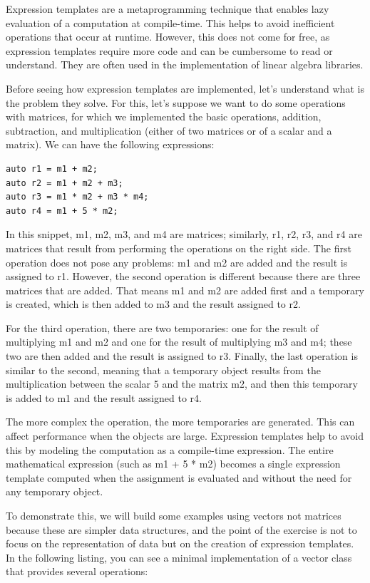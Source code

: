 
Expression templates are a metaprogramming technique that enables lazy evaluation of a computation at compile-time. This helps to avoid inefficient operations that occur at runtime. However, this does not come for free, as expression templates require more code and can be cumbersome to read or understand. They are often used in the implementation of linear algebra libraries.

Before seeing how expression templates are implemented, let’s understand what is the problem they solve. For this, let’s suppose we want to do some operations with matrices, for which we implemented the basic operations, addition, subtraction, and multiplication (either of two matrices or of a scalar and a matrix). We can have the following expressions:

\begin{lstlisting}[style=styleCXX]
auto r1 = m1 + m2;
auto r2 = m1 + m2 + m3;
auto r3 = m1 * m2 + m3 * m4;
auto r4 = m1 + 5 * m2;
\end{lstlisting}

In this snippet, m1, m2, m3, and m4 are matrices; similarly, r1, r2, r3, and r4 are matrices that result from performing the operations on the right side. The first operation does not pose any problems: m1 and m2 are added and the result is assigned to r1. However, the second operation is different because there are three matrices that are added. That means m1 and m2 are added first and a temporary is created, which is then added to m3 and the result assigned to r2.

For the third operation, there are two temporaries: one for the result of multiplying m1 and m2 and one for the result of multiplying m3 and m4; these two are then added and the result is assigned to r3. Finally, the last operation is similar to the second, meaning that a temporary object results from the multiplication between the scalar 5 and the matrix m2, and then this temporary is added to m1 and the result assigned to r4.

The more complex the operation, the more temporaries are generated. This can affect performance when the objects are large. Expression templates help to avoid this by modeling the computation as a compile-time expression. The entire mathematical expression (such as m1 + 5 * m2) becomes a single expression template computed when the assignment is evaluated and without the need for any temporary object.

To demonstrate this, we will build some examples using vectors not matrices because these are simpler data structures, and the point of the exercise is not to focus on the representation of data but on the creation of expression templates. In the following listing, you can see a minimal implementation of a vector class that provides several operations:

